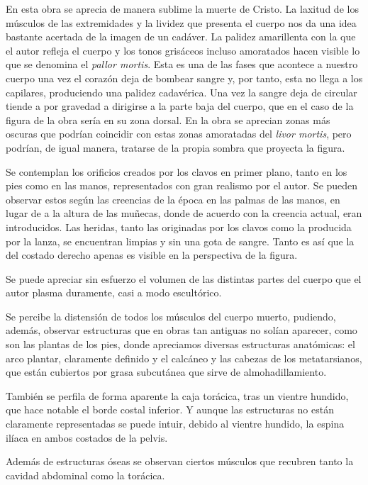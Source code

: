En esta obra se aprecia de manera sublime la muerte de Cristo. La laxitud de los músculos de las extremidades y la lividez que presenta el cuerpo nos da una idea bastante acertada de la imagen de un cadáver. La palidez amarillenta con la que el autor refleja el cuerpo y los tonos grisáceos incluso amoratados hacen visible lo que se denomina el \textit{pallor mortis}. Esta es una de las fases que acontece a nuestro cuerpo una vez el corazón deja de bombear sangre y, por tanto, esta no llega a los capilares, produciendo una palidez cadavérica. Una vez la sangre deja de circular tiende a por gravedad a dirigirse a la parte baja del cuerpo, que en el caso de la figura de la obra sería en su zona dorsal. En la obra se aprecian zonas más oscuras que podrían coincidir con estas zonas amoratadas del \textit{livor mortis}, pero podrían, de igual manera, tratarse de la propia sombra que proyecta la figura.

Se contemplan los orificios creados por los clavos en primer plano, tanto en los pies como en las manos, representados con gran realismo por el autor. Se pueden observar estos según las creencias de la época en las palmas de las manos, en lugar de a la altura de las muñecas, donde de acuerdo con la creencia actual, eran introducidos.
Las heridas, tanto las originadas por los clavos como la producida por la lanza, se encuentran limpias y sin una gota de sangre. Tanto es así que la del costado derecho apenas es visible en la perspectiva de la figura.

Se puede apreciar sin esfuerzo el volumen de las distintas partes del cuerpo que el autor plasma duramente, casi a modo escultórico. 

Se percibe la distensión de todos los músculos del cuerpo muerto, pudiendo, además, observar estructuras que en obras tan antiguas no solían aparecer, como son las plantas de los pies, donde apreciamos diversas estructuras anatómicas: el arco plantar, claramente definido y el calcáneo y las cabezas de los metatarsianos, que están cubiertos por grasa subcutánea que sirve de almohadillamiento.

También se perfila de forma aparente la caja torácica, tras un vientre hundido, que hace notable el borde costal inferior. Y aunque las estructuras no están claramente representadas se puede intuir, debido al vientre hundido, la espina ilíaca en ambos costados de la pelvis.

Además de estructuras óseas se observan ciertos músculos que recubren tanto la cavidad abdominal como la torácica.

